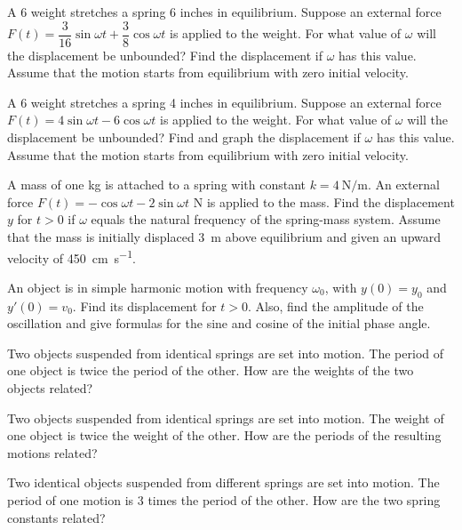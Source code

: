 \begin{exerciselist}
\item\label{exer:6.1.15}A \qty{6}{\pound} weight stretches a spring 6 inches in equilibrium. Suppose
an external force $F(t)=\dfrac{3}{16}\sin\omega
t+\dfrac{3}{8}\cos\omega t $ \unit{\pound} is applied to the weight. For what
value
of $\omega$ will the displacement be unbounded? Find the displacement
if $\omega$ has this value. Assume that the motion starts from
equilibrium with zero initial velocity.

\item\label{exer:6.1.16}\CGex
A \qty{6}{\pound} weight stretches a spring 4 inches in equilibrium. Suppose
an external force $ F(t)=4\sin\omega t-6\cos\omega t $ \unit{\pound} is applied
to the weight. For what value of $\omega$ will the displacement be
unbounded? Find and graph the displacement if $\omega$ has this value.
Assume that the motion starts from equilibrium with zero initial
velocity.

\item\label{exer:6.1.17}A mass of one \unit{\kilo\gram} is attached to a spring with constant $k=\qty{4}{\newton\per\meter}$. An
external force $F(t)=-\cos\omega t-2\sin\omega t$ \unit{\newton} is applied to the
mass. Find the displacement $y$ for $t>0$ if $\omega$ equals the
natural frequency of the spring-mass system. Assume that the
mass is initially displaced \qty{3}{\meter} above equilibrium and given an upward
velocity of \qty{450}{\centi\meter\per\second}.

\item\label{exer:6.1.18}An object is in simple harmonic motion
with frequency $\omega_0$, with $y(0)=y_0$ and $y'(0)=v_0$. Find
its displacement for $t>0$. Also, find the amplitude of the
oscillation and give formulas for the sine and cosine of the initial
phase angle.

\item\label{exer:6.1.19}Two objects suspended from identical springs are set into
motion.  The period of one object is twice the period of the other.
How are the weights of the two objects related?

\item\label{exer:6.1.20}Two objects suspended from identical springs are set into motion. The
weight of one object is twice the weight of the other. How are the
periods of the resulting motions related?

\item\label{exer:6.1.21}Two identical objects suspended from different springs are set into
motion. The period of one motion is 3 times the period of the
other. How are the two spring constants related?
\end{exerciselist}



